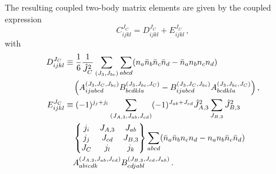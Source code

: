 The resulting coupled two-body matrix elements are given by the coupled expression
\begin{equation}
  C_{ijkl}^{J_C}
  = D_{ijkl}^{J_C}
  + E_{ijkl}^{J_C}\,,
\end{equation}
with
\begin{align}
  \phantom{D_{ijkl}^{J_C}}
   & \begin{aligned}
    \mathllap{D_{ijkl}^{J_C}} & \equiv
    \frac{1}{6} \frac{1}{\hat{J}_{C}^2}
    \sum_{(J_3, J_{bc})}
    \sum_{abcd}
    (
    n_a \bar{n}_b \bar{n}_c \bar{n}_d
    - \bar{n}_a n_b n_c n_d
    )                                  \\
                              & \quad
    \left(
    A_{ijabcd}^{(J_3, J_C, J_{bc})} B_{bcdkla}^{(J_3, J_{bc}, J_C)}
    - B_{ijabcd}^{(J_3, J_C, J_{bc})} A_{bcdkla}^{(J_3, J_{bc}, J_C)}
    \right),
  \end{aligned} \\
  \phantom{D_{ijkl}^{J_C}}
   & \begin{aligned}
    \mathllap{E_{ijkl}^{J_C}} & \equiv
    (-1)^{j_j + j_l}
    \sum_{(J_{A,3}, J_{ab}, J_{cd})}
    (-1)^{J_{ab} + J_{cd}} \hat{J}_{A,3}^2
    \sum_{J_{B,3}}
    \hat{J}_{B,3}^2                    \\
                              & \quad
    \ninej{j_i}{J_{A,3}}{J_{ab}}{j_j}{J_{cd}}{J_{B,3}}{J_{C}}{j_l}{j_k}
    \sum_{abcd}
    (
    \bar{n}_a \bar{n}_b n_c n_d
    - n_a n_b \bar{n}_c \bar{n}_d
    )                                  \\
                              & \quad
    A_{abicdk}^{(J_{A,3}, J_{ab}, J_{cd})}
    B_{cdjabl}^{(J_{B,3}, J_{cd}, J_{ab})}\,.
  \end{aligned}
\end{align}


